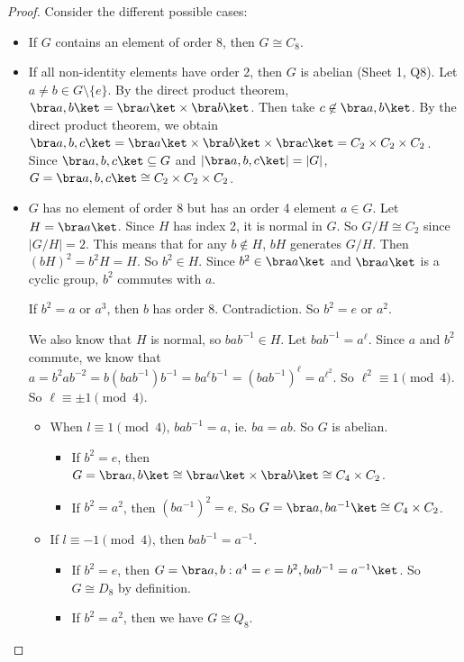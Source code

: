 \documentclass[a4paper]{article}
\begin{document}
\begin{proof}
  Consider the different possible cases:
  \begin{itemize}
    \item If $G$ contains an element of order 8, then $G\cong C_8$.
    \item If all non-identity elements have order 2, then $G$ is abelian (Sheet 1, Q8). Let $a\not= b\in G\setminus\{e\}$. By the direct product theorem, $\bra a, b\ket = \bra a\ket\times\bra b\ket$. Then take $c\not\in \bra a, b\ket$. By the direct product theorem, we obtain $\bra a, b, c\ket = \bra a\ket\times\bra b\ket\times\bra c\ket = C_2\times C_2\times C_2$. Since $\bra a, b, c\ket\subseteq G$ and $|\bra a, b, c\ket| = |G|$, $G = \bra a, b, c\ket \cong C_2\times C_2\times C_2$.
    \item $G$ has no element of order 8 but has an order 4 element $a\in G$. Let $H = \bra a\ket$. Since $H$ has index 2, it is normal in $G$. So $G/H \cong C_2$ since $|G/H| = 2$. This means that for any $b\not\in H$, $bH$ generates $G/H$. Then $(bH)^2 = b^2H = H$. So $b^2\in H$. Since $b^2\in \bra a\ket$ and $\bra a\ket$ is a cyclic group, $b^2$ commutes with $a$.

      If $b^2 = a$ or $a^3$, then $b$ has order 8. Contradiction. So $b^2 = e$ or $a^2$.

      We also know that $H$ is normal, so $bab^{-1}\in H$. Let $bab^{-1} = a^\ell$. Since $a$ and $b^2$ commute, we know that $a = b^2 ab^{-2}  = b(bab^{-1})b^{-1} = ba^\ell b^{-1} = (bab^{-1})^{\ell} = a^{\ell^2}$. So $\ell^2 \equiv 1\pmod 4$. So $\ell \equiv \pm 1 \pmod 4$.

      \begin{itemize}
        \item When $l\equiv 1\pmod 4$, $bab^{-1} = a$, ie. $ba = ab$. So $G$ is abelian.
          \begin{itemize}
            \item  If $b^2 = e$, then $G = \bra a, b\ket \cong \bra a\ket \times \bra b\ket \cong C_4\times C_2$.
            \item If $b^2 = a^2$, then $(ba^{-1})^2 = e$. So $G = \bra a, ba^{-1}\ket \cong C_4\times C_2$.
          \end{itemize}
        \item If $l \equiv -1\pmod 4$, then $bab^{-1} = a^{-1}$.
          \begin{itemize}
            \item If $b^2 = e$, then $G = \bra a, b: a^4 = e = b^2, bab^{-1} = a^{-1}\ket$. So $G\cong D_8$ by definition.
            \item If $b^2 = a^2$, then we have $G\cong Q_8$.
          \end{itemize}
      \end{itemize}
  \end{itemize}
\end{proof}
\end{document}
